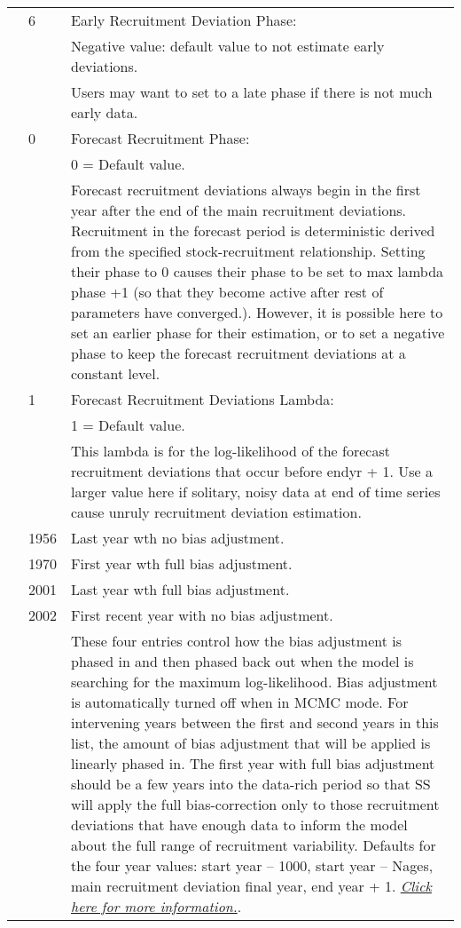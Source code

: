 \begin{longtable}{p{1cm} p{3cm} p{11cm}}
	\Tstrut & 6 & Early Recruitment Deviation Phase: \\
	& & Negative value: default value to not estimate early deviations. \\
	& & Users may want to set to a late phase if there is not much early data.\\
	
	\Tstrut & 0 & Forecast Recruitment Phase: \\
			&   & 0 = Default value. \\
	        &   & Forecast recruitment deviations always begin in the first year after the end of the main recruitment deviations. Recruitment in the forecast period is deterministic derived from the specified stock-recruitment relationship.  Setting their phase to 0 causes their phase to be set to max lambda phase +1 (so that they become active after rest of parameters have converged.).  However, it is possible here to set an earlier phase for their estimation, or to set a negative phase to keep the forecast recruitment deviations at a constant level.\Bstrut\\

	\Tstrut & 1 & Forecast Recruitment Deviations Lambda:\\
			&   & 1 = Default value. \\
			&   & This lambda is for the log-likelihood of the forecast recruitment deviations that occur before endyr + 1.  Use a larger value here if solitary, noisy data at end of time series cause unruly recruitment deviation estimation.\\
	
	\Tstrut & 1956 & Last year wth no bias adjustment. \\
			& 1970 & First year wth full bias adjustment. \\
			& 2001 & Last year wth full bias adjustment. \\
			& 2002 & First recent year with no bias adjustment. \\
			&      & These four entries control how the bias adjustment is phased in and then phased back out when the model is searching for the maximum log-likelihood.  Bias adjustment is automatically turned off when in MCMC mode.  For intervening years between the first and second years in this list, the amount of bias adjustment that will be applied is linearly phased in.  The first year with full bias adjustment should be a few years into the data-rich period so that SS will apply the full bias-correction only to those recruitment deviations that have enough data to inform the model about the full range of recruitment variability.  Defaults for the four year values: start year – 1000, start year – Nages, main recruitment deviation final year, end year + 1. \hyperlink{RecBias}{\textit{Click here for more information.}}.\\
	

\end{longtable}
